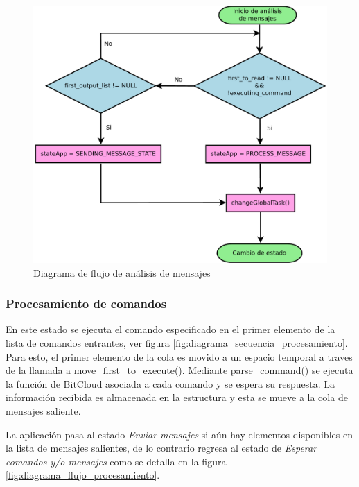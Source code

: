 \begin{figure}
	\centering
	\includegraphics[scale=0.35]{capitulo_3_imgs/analisis_mensajes_flujo.pdf}
	\caption{Diagrama de flujo de análisis de mensajes}
	\label{fig:diagrama_flujo_analisis}
\end{figure}


\subsubsection{Procesamiento de comandos}

En este estado se ejecuta el comando especificado en el primer elemento de la lista de comandos entrantes, ver figura \ref{fig:diagrama_secuencia_procesamiento}. Para esto, el primer elemento de la cola es movido a un espacio temporal a traves de la llamada a move\_first\_to\_execute(). Mediante parse\_command() se ejecuta la función de BitCloud asociada a cada comando y se espera su respuesta. La información recibida es almacenada en la estructura y esta se mueve a la cola de mensajes saliente.

La aplicación pasa al estado \textit{Enviar mensajes} si aún hay elementos disponibles en la lista de mensajes salientes, de lo contrario regresa al estado de \textit{Esperar comandos y/o mensajes} como se detalla en la figura \ref{fig:diagrama_flujo_procesamiento}. 

